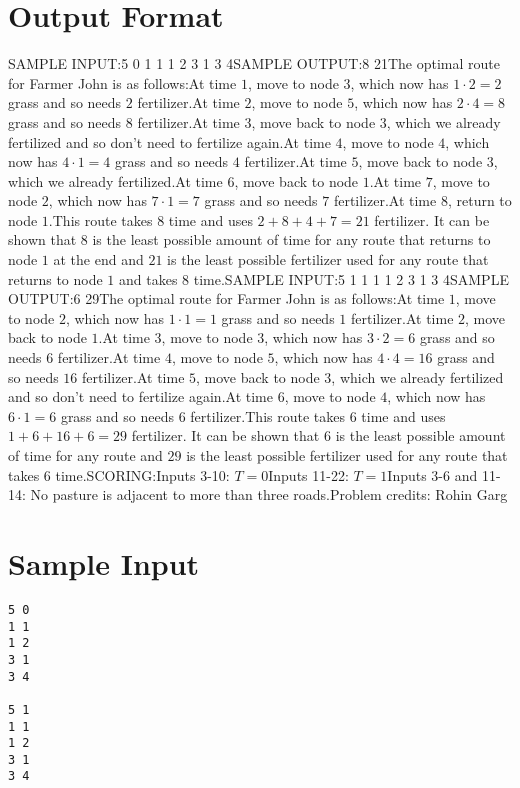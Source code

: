 \documentclass[12pt]{article}
\begin{document}
\section*{Output Format}
SAMPLE INPUT:5 0
1 1
1 2
3 1
3 4SAMPLE OUTPUT:8 21The optimal route for Farmer John is as follows:At time $1$, move to node $3$, which now has $1 \cdot 2 = 2$ grass and so
needs $2$ fertilizer.At time $2$, move to node $5$, which now has
$2 \cdot 4 = 8$ grass and so needs $8$ fertilizer.At time $3$, move
back to node $3$, which we already fertilized and so don't need to fertilize
again.At time $4$, move to node $4$, which now has $4 \cdot 1 = 4$
grass and so needs $4$ fertilizer.At time $5$, move back to node $3$,
which we already fertilized.At time $6$, move back to node $1$.At time $7$, move to node $2$, which now has $7 \cdot 1 = 7$ grass
and so needs $7$ fertilizer.At time $8$, return to node $1$.This route takes $8$ time and uses $2 + 8 + 4 + 7 = 21$ fertilizer. It can be
shown that $8$ is the least possible amount of time for any route that returns
to node $1$ at the end and $21$ is the least possible fertilizer used for any
route that returns to node $1$ and takes $8$ time.SAMPLE INPUT:5 1
1 1
1 2
3 1
3 4SAMPLE OUTPUT:6 29The optimal route for Farmer John is as follows:At time $1$, move to node $2$, which now has $1 \cdot 1 = 1$ grass and so
needs $1$ fertilizer.At time $2$, move back to node $1$.At time $3$, move to node $3$, which now has $3 \cdot 2 = 6$ grass and so needs
$6$ fertilizer.At time $4$, move to node $5$, which now has
$4 \cdot 4 = 16$ grass and so needs $16$ fertilizer.At time $5$,
move back to node $3$, which we already fertilized and so don't need to
fertilize again.At time $6$, move to node $4$, which now has
$6 \cdot 1 = 6$ grass and so needs $6$ fertilizer.This route takes $6$ time and uses $1 + 6 + 16 + 6 = 29$ fertilizer. It can be
shown that $6$ is the least possible amount of time for any route and $29$ is
the least possible fertilizer used for any route that takes $6$ time.SCORING:Inputs 3-10: $T=0$Inputs 11-22: $T=1$Inputs 3-6 and 11-14: No pasture is adjacent to more than three roads.Problem credits: Rohin Garg

\section*{Sample Input}
\begin{verbatim}
5 0
1 1
1 2
3 1
3 4

5 1
1 1
1 2
3 1
3 4
\end{verbatim}
\end{document}
